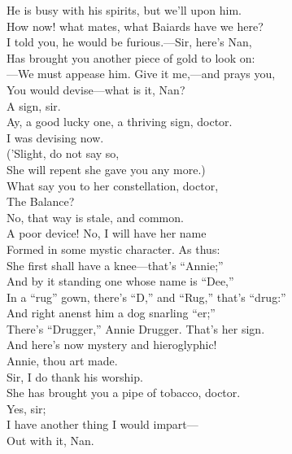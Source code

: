 \documentclass[a4paper,oneside,12pt]{memoir}
\begin{document}
\begin{drama*}
\facespeaks He is busy with his spirits, but we'll upon him.\\
\subtlespeaks How now! what mates, what Baiards have we here?\\
\facespeaks I told you, he would be furious.---Sir, here's Nan,\\
Has brought you another piece of gold to look on:\\
---We must appease him. Give it me,---and prays you,\\
You would devise---what is it, Nan?\\
\druggerspeaks {} A sign, sir.\\
\facespeaks Ay, a good lucky one, a thriving sign, doctor.\\
\subtlespeaks I was devising now.\\
\facespeaks {} ('Slight, do not say so,\\
She will repent she gave you any more.)\\
What say you to her constellation, doctor,\\
The Balance?\\
\subtlespeaks {} No, that way is stale, and common.\\
A poor device! No, I will have her name\\
Formed in some mystic character. As thus:\\
She first shall have a knee---that's ``Annie;''\\
And by it standing one whose name is ``Dee,''\\
In a ``rug'' gown, there's ``D,'' and ``Rug,'' that's ``drug:''\\
And right anenst him a dog snarling ``er;''\\
There's ``Drugger,'' Annie Drugger. That's her sign.\\
And here's now mystery and hieroglyphic!\\
\facespeaks Annie, thou art made.\\
\druggerspeaks {} Sir, I do thank his worship.\\
\facespeaks She has brought you a pipe of tobacco, doctor.\\
\druggerspeaks {} Yes, sir;\\
I have another thing I would impart---\\
\facespeaks Out with it, Nan.\\

\end{drama*}
\end{document}

